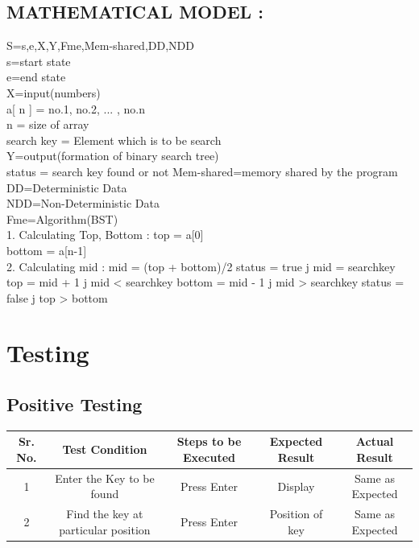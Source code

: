 \documentclass{article}
\begin{document}
\subsection{MATHEMATICAL MODEL : }
S={s,e,X,Y,Fme,Mem-shared,DD,NDD}\\
s=start state\\
e=end state\\
X=input(numbers)\\
a[ n ] = { no.1, no.2, ... , no.n }\\
n = size of array \\
search key = Element which is to be search \\
Y=output(formation of binary search tree)\\
status = search key found or not 
Mem-shared=memory shared by the program\\
DD=Deterministic Data\\
NDD=Non-Deterministic Data\\
Fme=Algorithm(BST)\\
1. Calculating Top, Bottom : 
top = a[0] \\
bottom = a[n-1]\\ 
2. Calculating mid : 
mid = (top + bottom)/2 
status = true j mid = searchkey 
top = mid + 1 j mid < searchkey 
bottom = mid - 1 j mid > searchkey 
status = false j top > bottom 

\section{Testing}

\vspace{20px}

\subsection{Positive Testing}
\begin{center}
	\begin{tabular}
		{|c|c|c|c|c|}\hline
		{\bf Sr. No.}		&{\bf Test Condition }	&{\bf Steps to be Executed}	&{\bf Expected Result} & Actual Result \\ \hline
		{1}	&	{Enter the Key to be found}& {Press Enter}		&  {Display} & {Same as Expected}\\ 
		\hline
		{2}	&	{Find the key at particular position}& {Press Enter}		&  {Position of key} & {Same as Expected}\\ 
		\hline
		
	\end{tabular}\\ 
\end{center}
\end{document}
